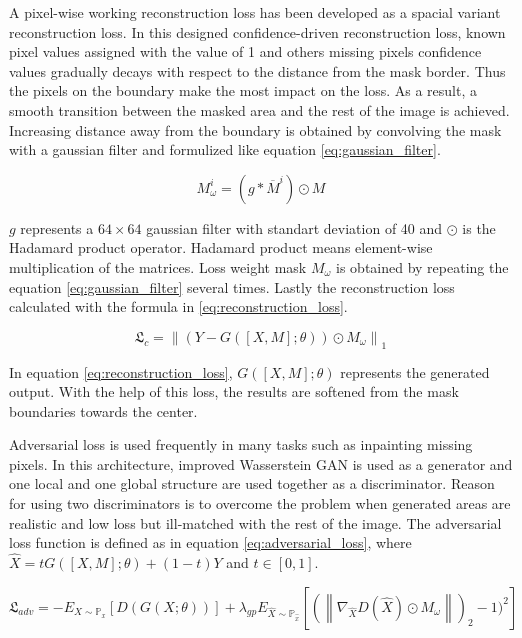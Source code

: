 A pixel-wise working reconstruction loss has been developed as a spacial variant reconstruction loss. In this designed confidence-driven reconstruction loss, known pixel values assigned with the value of 1 and others missing pixels confidence values gradually decays with respect to the distance from the mask border. Thus the pixels on the boundary make the most impact on the loss. As a result, a smooth transition between the masked area and the rest of the image is achieved. Increasing distance away from the boundary is obtained by convolving the mask with a gaussian filter and formulized like equation \ref{eq:gaussian_filter}.

\begin{equation}
    M_{\omega}^{i} = (g \ast \overline{M}^{i}) \odot M
    \label{eq:gaussian_filter}
\end{equation}

\(g\) represents a \(64 \times 64\) gaussian filter with standart deviation of 40 and \(\odot\) is the Hadamard product operator. Hadamard product means element-wise multiplication of the matrices. Loss weight mask \(M_{\omega}\) is obtained by repeating the equation \ref{eq:gaussian_filter} several times. Lastly the reconstruction loss calculated with the formula in \ref{eq:reconstruction_loss}.

\begin{equation}
    \mathfrak{L}_{c} = \left \| (Y - G([X, M]; \theta )) \odot M_{\omega} \right \|_{1}
    \label{eq:reconstruction_loss}
\end{equation}

In equation \ref{eq:reconstruction_loss}, \(G([X, M]; \theta )\) represents the generated output. With the help of this loss, the results are softened from the mask boundaries towards the center.

Adversarial loss is used frequently in many tasks such as inpainting missing pixels. In this architecture, improved Wasserstein GAN \cite{improved_train_wgan} is used as a generator and one local and one global structure are used together as a discriminator. Reason for using two discriminators is to overcome the problem when generated areas are realistic and low loss but ill-matched with the rest of the image. The adversarial loss function is defined as in equation \ref{eq:adversarial_loss}, where \(\widehat{X} = tG([X, M]; \theta) + (1 - t) Y\) and \(t \in [0, 1]\).

\begin{equation}
    \mathfrak{L}_{adv} = - E_{X \sim \mathbb{P}_{x}}[D(G(X;\theta))] + \lambda_{gp} E_{\widehat{X} \sim \mathbb{P}_{\widehat{x}}}[(\left \| \nabla_{\widehat{X}} D(\widehat{X}) \odot M_{\omega} \right \|)_{2} - 1)^{2}]
    \label{eq:adversarial_loss}
\end{equation}

